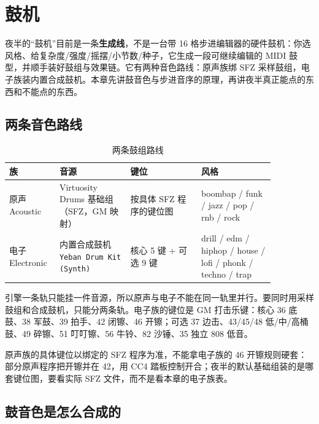 \chapter{鼓机}
\label{chap:drum-machine}


夜半的“鼓机”目前是一条\textbf{生成线}，不是一台带 16 格步进编辑器的硬件鼓机：你选风格、给复杂度/强度/摇摆/小节数/种子，它生成一段可继续编辑的 MIDI 鼓型，并顺手装好鼓组与效果链。它有两种音色路线：原声族绑 SFZ 采样鼓组，电子族装内置合成鼓机。本章先讲鼓音色与步进音序的原理，再讲夜半真正能点的东西和不能点的东西。

\section{两条音色路线}

\begin{table}[htbp]
\centering
\small
\begin{tabular}{@{}p{0.13\linewidth}p{0.24\linewidth}p{0.24\linewidth}p{0.25\linewidth}@{}}
\hline
族 & 音源 & 键位 & 风格 \\
\hline
原声 Acoustic & Virtuosity Drums 基础组（SFZ，GM 映射） & 按具体 SFZ 程序的键位图 & boombap / funk / jazz / pop / rnb / rock \\
电子 Electronic & 内置合成鼓机 \texttt{Yeban Drum Kit (Synth)} & 核心 5 键 + 可选 9 键 & drill / edm / hiphop / house / lofi / phonk / techno / trap \\
\hline
\end{tabular}
\caption{两条鼓组路线}
\label{tab:drum-families}
\end{table}

引擎一条轨只能挂一件音源，所以原声与电子不能在同一轨里并行。要同时用采样鼓组和合成鼓机，只能分两条轨。电子族的键位是 GM 打击乐键：核心 36 底鼓、38 军鼓、39 拍手、42 闭镲、46 开镲；可选 37 边击、43/45/48 低/中/高桶鼓、49 碎镲、51 叮叮镲、56 牛铃、82 沙锤、35 独立 808 低音。

原声族的具体键位以绑定的 SFZ 程序为准，不能拿电子族的 46 开镲规则硬套：部分原声程序把开镲并在 42，用 CC4 踏板控制开合；夜半的默认基础组装的是哪套键位图，要看实际 SFZ 文件，而不是看本章的电子族表。

\section{鼓音色是怎么合成的}

